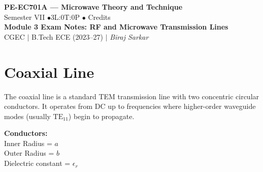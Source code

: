\documentclass[12pt,a4paper]{article}
\begin{document}

\begin{center}
  {\LARGE\bfseries\color{myred} PE-EC701A --- Microwave Theory and Technique}\\[5pt]
  {\normalsize\color{mydark} Semester VII \quad$\bullet$\quad 3L:0T:0P \quad$\bullet$ Credits}\\[3pt]
  {\normalsize\color{myteal}\textbf{Module 3 Exam Notes: RF and Microwave Transmission Lines}}\\[3pt]
  {\small\color{mydark} CGEC \;$|$\; B.Tech ECE (2023--27) \;$|$\; \textit{Biraj Sarkar}}
\end{center}
\vspace{2pt}
\noindent{\color{myred}\rule{\linewidth}{1.5pt}}
\vspace{2pt}

\hypersetup{linkcolor=mydark}
\tableofcontents
\hypersetup{linkcolor=myteal}
\newpage

\section{Coaxial Line}

The coaxial line is a standard TEM transmission line with two concentric circular conductors. It operates from DC up to frequencies where higher-order waveguide modes (usually $\text{TE}_{11}$) begin to propagate.

\begin{tcolorbox}[tikzbox, title={Coaxial Line Structure}]
\begin{minipage}[c]{0.45\linewidth}
\centering
{}
\end{minipage}\hfill
\begin{minipage}[c]{0.5\linewidth}
\raggedright
\textbf{Conductors:}\\[3pt]
Inner Radius = $a$\\
Outer Radius = $b$\\
Dielectric constant = $\epsilon_r$
\end{minipage}
\end{tcolorbox}
\end{document}

